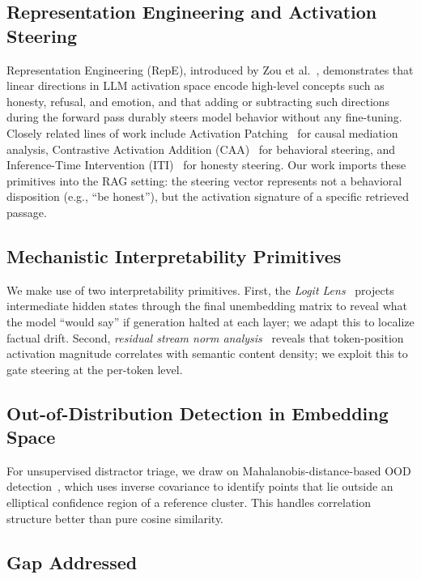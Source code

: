 \documentclass[conference]{IEEEtran}
\begin{document}
\subsection{Representation Engineering and Activation Steering}

Representation Engineering (RepE), introduced by Zou et al.~\cite{zou2023representation}, demonstrates that linear directions in LLM activation space encode high-level concepts such as honesty, refusal, and emotion, and that adding or subtracting such directions during the forward pass durably steers model behavior without any fine-tuning. Closely related lines of work include Activation Patching~\cite{meng2022rome} for causal mediation analysis, Contrastive Activation Addition (CAA)~\cite{rimsky2023caa} for behavioral steering, and Inference-Time Intervention (ITI)~\cite{li2023iti} for honesty steering. Our work imports these primitives into the RAG setting: the steering vector represents not a behavioral disposition (e.g., ``be honest''), but the activation signature of a specific retrieved passage.

\subsection{Mechanistic Interpretability Primitives}

We make use of two interpretability primitives. First, the \emph{Logit Lens}~\cite{nostalgebraist2020logitlens, belrose2023logitlens} projects intermediate hidden states through the final unembedding matrix to reveal what the model ``would say'' if generation halted at each layer; we adapt this to localize factual drift. Second, \emph{residual stream norm analysis}~\cite{elhage2021framework} reveals that token-position activation magnitude correlates with semantic content density; we exploit this to gate steering at the per-token level.

\subsection{Out-of-Distribution Detection in Embedding Space}

For unsupervised distractor triage, we draw on Mahalanobis-distance-based OOD detection~\cite{lee2018mahalanobis}, which uses inverse covariance to identify points that lie outside an elliptical confidence region of a reference cluster. This handles correlation structure better than pure cosine similarity.

\subsection{Gap Addressed}
\end{document}
